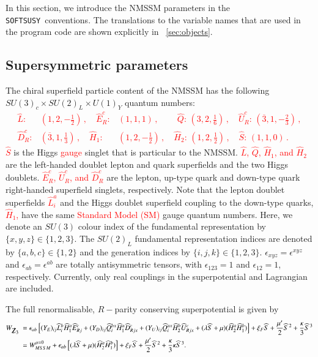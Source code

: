 \documentclass[final,3p,times,pdflatex]{elsarticle}
\def\SOFTSUSY{{\tt SOFTSUSY}\ }
\newcommand{\Zv}{{\mbox{$\slashed{Z}_{3}$}\ }} %
\newcommand*{\red}[1]{\textcolor{red}{#1}}
\begin{document}
In this section, we introduce the NMSSM parameters
in the \SOFTSUSY conventions. The translations to the variable
names that are used in the program code are shown explicitly in
~\ref{sec:objects}. 

\subsection{Supersymmetric parameters \label{susypars}}
The chiral superfield particle content of the NMSSM has the 
following $SU(3)_c\times SU(2)_L\times U(1)_Y$ quantum numbers:
\red{\begin{eqnarray}
\widehat{L}:&(1,2,-\frac{1}{2})\,,\quad \widehat{E}^c_R:&(1,1,1)\,,
\qquad\, \widehat{Q}:\,(3,2,\tfrac{1}{6})\,,
\quad \widehat{U}^c_R:\,(\overline 3,1,-\tfrac{2}{3})\,,\nonumber\\ 
\widehat{D}^c_R:&(\overline 3,1,\tfrac{1}{3})\,,\quad
\widehat{H}_1:&(1,2,-\tfrac{1}{2})\,,\quad 
\widehat{H}_2:\,(1,2,\tfrac{1}{2})\,,\quad \widehat{S}:\,(1,1,0)\,.
\label{fields}
\end{eqnarray}} %
\red{$\widehat S$} %
 is the Higgs \red{gauge} %
 singlet that is particular to the NMSSM.
\red{$\widehat L$, $\widehat Q$, $\widehat H_1$, and $\widehat H_2$} %
 are the left-handed doublet lepton and
quark superfields and the two Higgs doublets. \red{$\widehat{E}^c_R$, 
$\widehat{U}^c_R$, and $\widehat{D}^c_R$} %
 are the lepton, up-type quark and down-type quark
right-handed superfield singlets, respectively. 
Note that the lepton
doublet superfields \red{$\widehat{L}^a_i$} %
 and the Higgs doublet superfield coupling
to the down-type quarks, \red{$\widehat{H}_1$,} %
 have the same \red{Standard Model (SM)} %
 gauge quantum numbers. 
Here, we denote an $SU(3)$ colour index of the fundamental
representation by  $\{x,y,z\} \in \{1,2,3 \}$. The $SU(2)_L$ fundamental
representation indices are denoted by $\{a,b,c\} \in \{1,2\}$ and the generation
indices by $\{i,j,k\} \in \{1,2,3\}$. 
$\epsilon_{xyz}=\epsilon^{xyz}$ and  $\epsilon_{ab}=\epsilon^{ab}$ are totally
antisymmetric tensors, with $\epsilon_{123}=1$ and $\epsilon_{12}=1$,
respectively.  Currently, only real couplings in the superpotential and Lagrangian are included. 

The full renormalisable, $R-$parity conserving superpotential is given by
\red{
\begin{align} 
 W_{\Zv}  &=  \epsilon_{ab} \left[ (Y_E)_{ij} \widehat{L}_i^b
\widehat{H}_1^a \widehat{E}^c_{Rj} + (Y_D)_{ij} \widehat{Q}_i^{bx} \widehat{H}_1^a \widehat{D}^c_{Rjx} +
(Y_U)_{ij} \widehat{Q}_i^{ax} \widehat{H}_2^b \widehat{U}^c_{Rjx} 
+(\lambda \widehat{S} + \mu)(\widehat{H}^a_2 \widehat{H}^b_1) \right ]  + \xi_F\widehat{S} + \frac{\mu^\prime}{2} \widehat{S}^{\,2} +\frac{\kappa}{3}\widehat{S}^{\, 3} \\
 &= W_{MSSM}^{\mu =0}  +  \epsilon_{ab}\left [(\lambda \widehat{S} + \mu)(\widehat{H}^a_2 \widehat{H}^b_1) \right ]  + \xi_F\widehat{S} + \frac{\mu^\prime}{2}\widehat{S}^{\, 2} + \frac{\kappa}{3}\kappa\widehat{S}^{\, 3}. 
\label{eq:WZ3V}
\end{align}
} %
 
\end{document}
